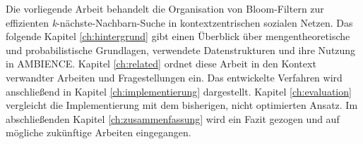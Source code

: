 Die vorliegende Arbeit behandelt die Organisation von Bloom-Filtern zur effizienten \textit{k}-nächste-Nachbarn-Suche in kontextzentrischen sozialen Netzen. Das folgende Kapitel \ref{ch:hintergrund} gibt einen Überblick über mengentheoretische und probabilistische Grundlagen, verwendete Datenstrukturen und ihre Nutzung in AMBIENCE. Kapitel \ref{ch:related} ordnet diese Arbeit in den Kontext verwandter Arbeiten und Fragestellungen ein. Das entwickelte Verfahren wird anschließend in Kapitel \ref{ch:implementierung} dargestellt. Kapitel \ref{ch:evaluation} vergleicht die Implementierung mit dem bisherigen, nicht optimierten Ansatz. Im abschließenden Kapitel \ref{ch:zusammenfassung} wird ein Fazit gezogen und auf mögliche zukünftige Arbeiten eingegangen. 